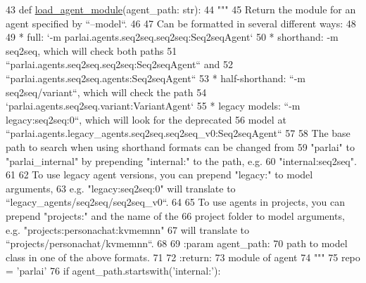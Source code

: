 \begin{DoxyCode}
43 \textcolor{keyword}{def }\hyperlink{namespaceparlai_1_1core_1_1loader_a8e6a8f524cba24b80e9bd157c2e0ab8b}{load\_agent\_module}(agent\_path: str):
44     \textcolor{stringliteral}{"""}
45 \textcolor{stringliteral}{    Return the module for an agent specified by ``--model``.}
46 \textcolor{stringliteral}{}
47 \textcolor{stringliteral}{    Can be formatted in several different ways:}
48 \textcolor{stringliteral}{}
49 \textcolor{stringliteral}{    * full: `-m parlai.agents.seq2seq.seq2seq:Seq2seqAgent`}
50 \textcolor{stringliteral}{    * shorthand: -m seq2seq, which will check both paths}
51 \textcolor{stringliteral}{      ``parlai.agents.seq2seq.seq2seq:Seq2seqAgent`` and}
52 \textcolor{stringliteral}{      ``parlai.agents.seq2seq.agents:Seq2seqAgent``}
53 \textcolor{stringliteral}{    * half-shorthand: ``-m seq2seq/variant``, which will check the path}
54 \textcolor{stringliteral}{      `parlai.agents.seq2seq.variant:VariantAgent`}
55 \textcolor{stringliteral}{    * legacy models: ``-m legacy:seq2seq:0``, which will look for the deprecated}
56 \textcolor{stringliteral}{      model at ``parlai.agents.legacy\_agents.seq2seq.seq2seq\_v0:Seq2seqAgent``}
57 \textcolor{stringliteral}{}
58 \textcolor{stringliteral}{    The base path to search when using shorthand formats can be changed from}
59 \textcolor{stringliteral}{    "parlai" to "parlai\_internal" by prepending "internal:" to the path, e.g.}
60 \textcolor{stringliteral}{    "internal:seq2seq".}
61 \textcolor{stringliteral}{}
62 \textcolor{stringliteral}{    To use legacy agent versions, you can prepend "legacy:" to model arguments,}
63 \textcolor{stringliteral}{    e.g. "legacy:seq2seq:0" will translate to ``legacy\_agents/seq2seq/seq2seq\_v0``.}
64 \textcolor{stringliteral}{}
65 \textcolor{stringliteral}{    To use agents in projects, you can prepend "projects:" and the name of the}
66 \textcolor{stringliteral}{    project folder to model arguments, e.g. "projects:personachat:kvmemnn"}
67 \textcolor{stringliteral}{    will translate to ``projects/personachat/kvmemnn``.}
68 \textcolor{stringliteral}{}
69 \textcolor{stringliteral}{    :param agent\_path:}
70 \textcolor{stringliteral}{        path to model class in one of the above formats.}
71 \textcolor{stringliteral}{}
72 \textcolor{stringliteral}{    :return:}
73 \textcolor{stringliteral}{        module of agent}
74 \textcolor{stringliteral}{    """}
75     repo = \textcolor{stringliteral}{'parlai'}
76     \textcolor{keywordflow}{if} agent\_path.startswith(\textcolor{stringliteral}{'internal:'}):

\end{DoxyCode}
